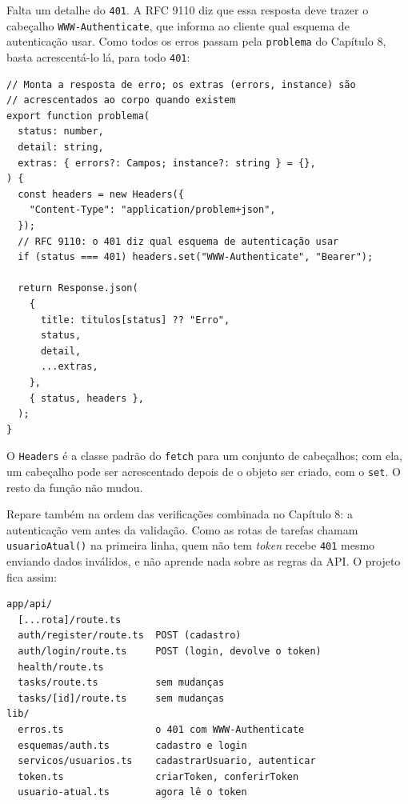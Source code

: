 Falta um detalhe do \texttt{401}. A RFC 9110 diz que essa resposta deve trazer o cabeçalho \texttt{WWW-Authenticate}, que informa ao cliente qual esquema de autenticação usar. Como todos os erros passam pela \texttt{problema} do Capítulo 8, basta acrescentá-lo lá, para todo \texttt{401}:

\begin{codigo}
\begin{Verbatim}[breaklines=true, breaksymbolleft={}, fontsize=\footnotesize]
// Monta a resposta de erro; os extras (errors, instance) são
// acrescentados ao corpo quando existem
export function problema(
  status: number,
  detail: string,
  extras: { errors?: Campos; instance?: string } = {},
) {
  const headers = new Headers({
    "Content-Type": "application/problem+json",
  });
  // RFC 9110: o 401 diz qual esquema de autenticação usar
  if (status === 401) headers.set("WWW-Authenticate", "Bearer");

  return Response.json(
    {
      title: titulos[status] ?? "Erro",
      status,
      detail,
      ...extras,
    },
    { status, headers },
  );
}
\end{Verbatim}
\end{codigo}

O \texttt{Headers} é a classe padrão do \texttt{fetch} para um conjunto de cabeçalhos; com ela, um cabeçalho pode ser acrescentado depois de o objeto ser criado, com o \texttt{set}. O resto da função não mudou.

Repare também na ordem das verificações combinada no Capítulo 8: a autenticação vem antes da validação. Como as rotas de tarefas chamam \texttt{usuarioAtual()} na primeira linha, quem não tem \textit{token} recebe \texttt{401} mesmo enviando dados inválidos, e não aprende nada sobre as regras da API. O projeto fica assim:

\begin{codigo}
\begin{Verbatim}[breaklines=true, breaksymbolleft={}, fontsize=\footnotesize]
app/api/
  [...rota]/route.ts
  auth/register/route.ts  POST (cadastro)
  auth/login/route.ts     POST (login, devolve o token)
  health/route.ts
  tasks/route.ts          sem mudanças
  tasks/[id]/route.ts     sem mudanças
lib/
  erros.ts                o 401 com WWW-Authenticate
  esquemas/auth.ts        cadastro e login
  servicos/usuarios.ts    cadastrarUsuario, autenticar
  token.ts                criarToken, conferirToken
  usuario-atual.ts        agora lê o token
\end{Verbatim}
\end{codigo}

